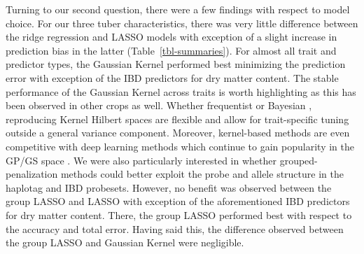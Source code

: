 \begin{refsection}
Turning to our second question, there were a few findings with respect
to model choice. For our three tuber characteristics, there was very
little difference between the ridge regression and LASSO models with
exception of a slight increase in prediction bias in the latter
(Table~\ref{tbl-summaries}). For almost all trait and predictor types,
the Gaussian Kernel performed best minimizing the prediction error with
exception of the IBD predictors for dry matter content. The stable
performance of the Gaussian Kernel across traits is worth highlighting
as this has been observed in other crops as well. Whether frequentist
\parencite{Endelman2011} or Bayesian \parencite{Gianola2008}, reproducing
Kernel Hilbert spaces are flexible and allow for trait-specific tuning
outside a general variance component. Moreover, kernel-based methods are
even competitive with deep learning methods which continue to gain
popularity in the GP/GS space \parencite{Crossa2019}. We were also
particularly interested in whether grouped-penalization methods could
better exploit the probe and allele structure in the haplotag and IBD
probesets. However, no benefit was observed between the group LASSO and
LASSO with exception of the aforementioned IBD predictors for dry matter
content. There, the group LASSO performed best with respect to the
accuracy and total error. Having said this, the difference observed
between the group LASSO and Gaussian Kernel were negligible.


\end{refsection}
